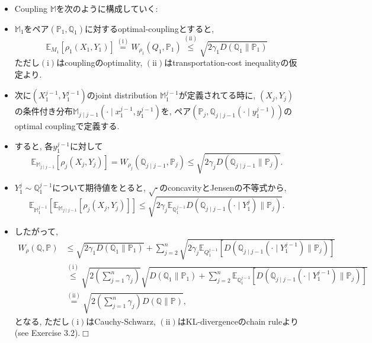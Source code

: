 \documentclass[aspectratio=169, dvipdfmx]{beamer}
\def\qed{\hfill $\Box$}
\newcommand{\ex}{\mathbb{E}}
\newcommand{\bb}{\mathbb}
\begin{document}
\begin{frame}
\begin{itemize}
    \item Coupling $\bb{M}$を次のように構成していく:
    \item $\bb{M}_1$をペア$(\bb{P}_1, \bb{Q}_1)$に対するoptimal-couplingとすると,
    \[
        \mathbb{E}_{M_{1}}\left[\rho_{1}\left(X_{1}, Y_{1}\right)\right]
        \stackrel{(\mathrm{i})}{=} W_{\rho_1}\left(Q_{1}, \mathbb{P}_{1}\right)
        \stackrel{(\mathrm{ii})} \leq \sqrt{2 \gamma_{1} D\left(\mathbb{Q}_{1} \| \mathbb{P}_{1}\right)}
    \]
    ただし$\mathrm{(i)}$はcouplingのoptimality, $\mathrm{(ii)}$はtransportation-cost inequalityの仮定より.
    \item 次に$(X_1^{j-1}, Y_1^{j-1})$のjoint distribution $\bb{M}_1^{j-1}$が定義されてる時に,
    $(X_j, Y_j)$の条件付き分布$\bb{M}_{j\mid j-1}(\cdot \mid x_1^{j-1}, y_1^{j-1})$を,
    ペア$(\bb{P}_j, \bb{Q}_{j\mid j-1}(\cdot \mid y_1^{j-1}))$のoptimal couplingで定義する.
    \item すると, 各$y_1^{j-1}$に対して
    \[
        \ex_{\bb{M}_{j\mid j-1}}[\rho_j(X_j, Y_j)]
        = W_{\rho_j}\left( \bb{Q}_{j\mid j-1}, \bb{P}_j \right)
        \le \sqrt{2 \gamma_j D(\bb{Q}_{j \mid j-1} \| \bb{P}_j)}.
    \]
    \item $Y_1^j \sim \bb{Q}_1^{j-1}$について期待値をとると, $\sqrt{\cdot}$のconcavityとJensenの不等式から,
    \[
        \ex_{\bb{M}_1^{j-1}}\left[\ex_{\bb{M}_{j\mid j-1}}[\rho_j(X_j, Y_j)]\right]
        \le \sqrt{2 \gamma_j \ex_{\bb{Q}_{1}^{j-1}}D(\bb{Q}_{j \mid j-1}(\cdot \mid Y_1^j)\| \bb{P}_j) }.
    \]
\end{itemize}
\end{frame}

\begin{frame}
\begin{itemize}
    \item したがって,
    \begin{align*}
        W_{\rho}(\mathbb{Q}, \mathbb{P})
        & \leq \sqrt{2 \gamma_{1} D\left(\mathbb{Q}_{1} \| \mathbb{P}_{1}\right)}+\sum_{j=2}^{n} \sqrt{2 \gamma_{j} \mathbb{E}_{Q_{1}^{j-1}}\left[D\left(\mathbb{Q}_{j \mid j-1}\left(\cdot \mid Y_{1}^{j-1}\right) \| \mathbb{P}_{j}\right)\right]} \\
        & \stackrel{(\mathrm{i})}{\leq} \sqrt{2\left(\sum_{j=1}^{n} \gamma_{j}\right)} \sqrt{D\left(\mathbb{Q}_{1} \| \mathbb{P}_{1}\right)+\sum_{j=2}^{n} \mathbb{E}_{\mathbb{Q}_{1}^{j-1}}\left[D\left(\mathbb{Q}_{j \mid j-1}\left(\cdot \mid Y_{1}^{j-1}\right) \| \mathbb{P}_{j}\right)\right]} \\
        & \stackrel{(\mathrm{ii})}{=} \sqrt{2\left(\sum_{j=1}^{n} \gamma_{j}\right) D(\mathbb{Q} \| \mathbb{P})},
    \end{align*}
    となる, ただし$\mathrm{(i)}$はCauchy-Schwarz, $\mathrm{(ii)}$はKL-divergenceのchain ruleより(see Exercise 3.2).\qed
\end{itemize}
\end{frame}
\end{document}
